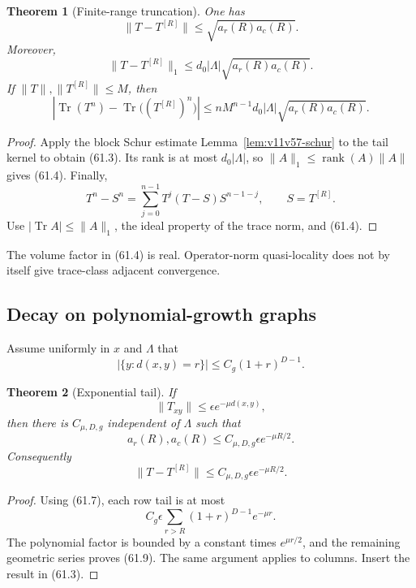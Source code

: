 \documentclass[11pt]{article}
\newtheorem{theorem}{Theorem}[section]
\begin{document}
\begin{theorem}[Finite-range truncation]
\label{thm:v11v61-truncation}
One has
\[
 \lVert T-T^{[R]}\rVert
                     \le\sqrt{a_r(R)a_c(R)}.                  \tag{61.3}
\]
Moreover,
\[
 \lVert T-T^{[R]}\rVert_1
 \le d_0|\Lambda|\sqrt{a_r(R)a_c(R)}.                         \tag{61.4}
\]
If \(\lVert T\rVert,\lVert T^{[R]}\rVert\le M\), then
\[
 \left|\operatorname{Tr}(T^n)
       -\operatorname{Tr}\bigl((T^{[R]})^n\bigr)\right|
 \le nM^{n-1}d_0|\Lambda|
                    \sqrt{a_r(R)a_c(R)}.                      \tag{61.5}
\]
\end{theorem}

\begin{proof}
Apply the block Schur estimate
Lemma~\ref{lem:v11v57-schur} to the tail kernel to obtain (61.3).
Its rank is at most \(d_0|\Lambda|\), so
\(\lVert A\rVert_1\le\operatorname{rank}(A)\lVert A\rVert\)
gives (61.4).  Finally,
\[
 T^n-S^n=\sum_{j=0}^{n-1}T^j(T-S)S^{n-1-j},\qquad S=T^{[R]}. \tag{61.6}
\]
Use \(|\operatorname{Tr}A|\le\lVert A\rVert_1\), the ideal property of
the trace norm, and (61.4).
\end{proof}

The volume factor in (61.4) is real.  Operator-norm quasi-locality does
not by itself give trace-class adjacent convergence.

\subsection{Decay on polynomial-growth graphs}

Assume uniformly in \(x\) and \(\Lambda\) that
\[
                 |\{y:d(x,y)=r\}|\le C_g(1+r)^{D-1}.          \tag{61.7}
\]

\begin{theorem}[Exponential tail]
\label{thm:v11v61-exponential}
If
\[
                         \lVert T_{xy}\rVert
                    \le\epsilon e^{-\mu d(x,y)},              \tag{61.8}
\]
then there is \(C_{\mu,D,g}\) independent of \(\Lambda\) such that
\[
 a_r(R),a_c(R)
 \le C_{\mu,D,g}\epsilon e^{-\mu R/2}.                        \tag{61.9}
\]
Consequently
\[
 \lVert T-T^{[R]}\rVert
 \le C_{\mu,D,g}\epsilon e^{-\mu R/2}.                        \tag{61.10}
\]
\end{theorem}

\begin{proof}
Using (61.7), each row tail is at most
\[
 C_g\epsilon\sum_{r>R}(1+r)^{D-1}e^{-\mu r}.
\]
The polynomial factor is bounded by a constant times \(e^{\mu r/2}\),
and the remaining geometric series proves (61.9).  The same argument
applies to columns.  Insert the result in (61.3).
\end{proof}
\end{document}
